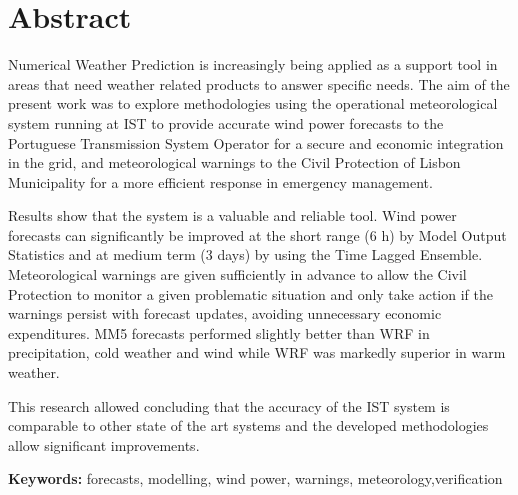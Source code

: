 \chapter{Abstract}\label{sec:abstract} 

Numerical Weather Prediction is increasingly being applied as a support tool in areas that need weather related products to answer specific needs. The aim of the present work was to explore methodologies using the operational meteorological system running at IST to provide accurate wind power forecasts to the Portuguese Transmission System Operator for a secure and economic integration in the grid, and meteorological warnings to the Civil Protection of Lisbon Municipality for a more efficient response in emergency management. 

Results show that the system is a valuable and reliable tool. Wind power forecasts can significantly be improved at the short range (6 h) by Model Output Statistics and at medium term (3 days) by using the Time Lagged Ensemble. Meteorological warnings are given sufficiently in advance to allow the Civil Protection to monitor a given problematic situation and only take action if the warnings persist with forecast updates, avoiding unnecessary economic expenditures. MM5 forecasts performed slightly better than WRF in precipitation, cold weather and wind while WRF was markedly superior in warm weather.

This research allowed concluding that the accuracy of the IST system is comparable to other state of the art systems and the developed methodologies allow significant improvements.


\vspace{1.5cm}%

\textbf{Keywords:} forecasts, modelling, wind power, warnings, meteorology,verification
